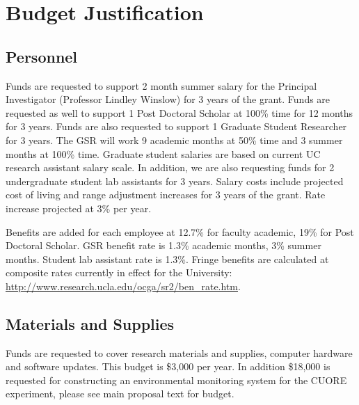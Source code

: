 \section{Budget Justification}

\subsection{Personnel}

Funds are requested to support 2 month summer salary for the Principal Investigator (Professor Lindley Winslow) for 3 years of the grant.  Funds are requested as well to support 1 Post Doctoral Scholar at 100\% time for 12 months for 3 years.  Funds are also requested to support 1 Graduate Student Researcher for 3 years. The GSR will work 9 academic months at 50\% time and 3 summer months at 100\% time. Graduate student salaries are based on current UC research assistant salary scale. In addition, we are also requesting funds for 2 undergraduate student lab assistants for 3 years. Salary costs include projected cost of living and range adjustment increases for 3 years of the grant.  Rate increase projected at 3\% per year.

Benefits are added for each employee at 12.7\% for faculty academic, 19\% for Post Doctoral Scholar.  GSR benefit rate is 1.3\% academic months, 3\% summer months.  Student lab assistant rate is 1.3\%. Fringe benefits are calculated at composite rates currently in effect for the University: \url{http://www.research.ucla.edu/ocga/sr2/ben_rate.htm}.

\subsection{Materials and Supplies}
Funds are requested to cover research materials and supplies, computer hardware and software updates. This budget is \$3,000 per year. In addition \$18,000 is requested for constructing an environmental monitoring system for the CUORE experiment, please see main proposal text for budget.


